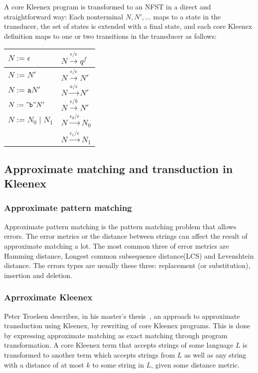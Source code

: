 A core Kleenex program is transformed to an NFST in a direct and
straightforward way: Each nonterminal $N, N', \dots$ maps to a state in the
transducer, the set of states is extended with a final state, and each core
Kleenex definition maps to one or two transitions in the transducer as follows:

\begin{center}
  \begin{tabular}{|l|l|}
    \hline
    $N := \epsilon$       & $N \xrightarrow{\epsilon/\epsilon} q^f$   \\
    \hline
    $N := N'$             & $N \xrightarrow{\epsilon/\epsilon} N'$    \\
    \hline
    $N := \mathtt{a}N'$   & $N \xrightarrow{a/\epsilon} N'$           \\
    \hline
    $N := \mathtt{"b"}N'$ & $N \xrightarrow{\epsilon/b} N'$           \\
    \hline
    $N := N_0 \;|\; N_1$  & $N \xrightarrow{\epsilon_0/\epsilon} N_0$ \\
                          & $N \xrightarrow{\epsilon_1/\epsilon} N_1$ \\
    \hline
  \end{tabular}
\end{center}



\subsection{Approximate matching and transduction in Kleenex}
\subsubsection{Approximate pattern matching}
Approximate pattern matching is the pattern matching problem that allows errors. The error metrics or the distance between strings can affect the result of approximate matching a lot. The most common three of error metrics are Hamming distance, Longest common subsequence distance(LCS) and Levenshtein distance. The errors types are usually these three: replacement (or substitution), insertion and deletion.


\subsubsection{Aprroximate Kleenex}
Peter Troelsen describes, in his master's
thesis~\cite{troelsen2016approximate}, an approach to approximate transduction
using Kleenex, by rewriting of core Kleenex programs. This is done by
expressing approximate matching as exact matching through program
transformation. A core Kleenex term that accepts strings of some language $L$
is transformed to another term which accepts strings from $L$ as well as any
string with a distance of at most $k$ to some string in $L$, given some
distance metric.

